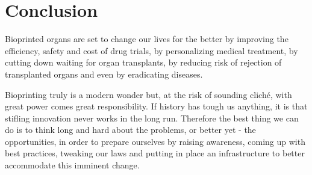 \documentclass[12pt]{article} %
\begin{document}
\newpage 

\section{Conclusion} %

Bioprinted organs are set to change our lives for the better by improving the efficiency, safety and cost of drug trials, by personalizing medical treatment, by cutting down waiting for organ transplants, by reducing risk of rejection of transplanted organs and even by eradicating diseases.  

Bioprinting truly is a modern wonder but, at the risk of sounding cliché, with great power comes great responsibility. 
If history has tough us anything, it is that stifling innovation never works in the long run. Therefore the best thing we can do is to think long and hard about the problems, or better yet - the opportunities, in order to prepare ourselves by raising awareness, coming up with best practices, tweaking our laws and putting in place an infrastructure to better accommodate this imminent change.

\newpage

\end{document}
